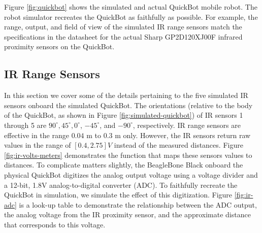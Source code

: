 \documentclass[10pt]{article}
\begin{document}
Figure \ref{fig:quickbot} shows the simulated and actual QuickBot mobile robot. The robot simulator recreates the QuickBot as faithfully as possible. For example, the range, output, and field of view of the simulated IR range sensors match the specifications in the datasheet for the actual Sharp GP2D120XJ00F infrared proximity sensors on the QuickBot.

\subsection{IR Range Sensors}\label{irprox}
In this section we cover some of the details pertaining to the five simulated IR sensors onboard the simulated QuickBot. 
The orientations (relative to the body of the QuickBot, as shown in Figure \ref{fig:simulated-quickbot}) of IR sensors 1 through 5 are $90^\circ, 45^\circ, 0^\circ$, $-45^\circ$, and $-90^\circ$, respectively. IR range sensors are effective in the range $0.04$ m to $0.3$ m only. However, the IR sensors return raw values in the range of $[0.4,2.75] V$ instead of the measured distances. Figure \ref{fig:ir-volts-meters} demonstrates the function that maps these sensors values to distances. To complicate matters slightly, the BeagleBone Black onboard the physical QuickBot digitizes the analog output voltage using a voltage divider and a 12-bit, 1.8V analog-to-digital converter (ADC). To faithfully recreate the QuickBot in simulation, we simulate the effect of this digitization. Figure \ref{fig:ir-adc} is a look-up table to demonstrate the relationship between the ADC output, the analog voltage from the IR proximity sensor, and the approximate distance that corresponds to this voltage.
\end{document}

